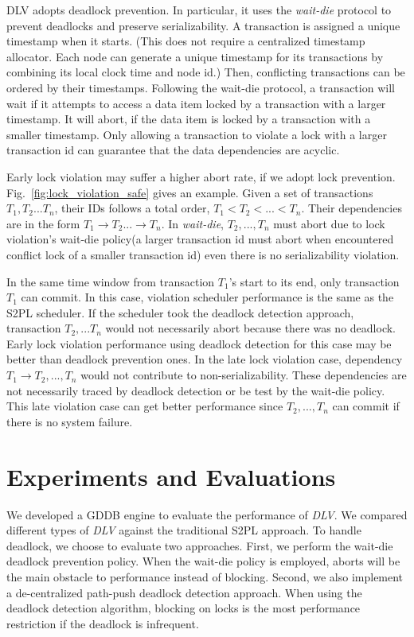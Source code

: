 \documentclass[conference]{IEEEtran}
\begin{document}
DLV adopts deadlock prevention.
In particular, it uses the \emph{wait-die} protocol to prevent deadlocks and preserve serializability.
A transaction is assigned a unique timestamp when it starts.
(This does not require a centralized timestamp allocator.
Each node can generate a unique timestamp for its transactions by combining its local clock time and node id.)
Then, conflicting transactions can be ordered by their timestamps.
Following the wait-die protocol, a transaction will wait if it attempts to access a data item locked by a transaction with a larger timestamp.
It will abort, if the data item is locked by a transaction with a smaller timestamp.
Only allowing a transaction to violate a lock with a larger transaction id can guarantee that the data dependencies are acyclic.


Early lock violation may suffer a higher abort rate, if we adopt lock prevention.
Fig.~\ref{fig:lock_violation_safe} gives an example.
Given a set of transactions ${T_1, T_2... T_n}$, their IDs follows a total order, ${T_1 < T_2 < ... < T_n}$.
Their dependencies are in the form ${T_1 \rightarrow T_2 ... \rightarrow T_n}$.
In \emph{wait-die}, ${T_2, ..., T_n}$ must abort due to lock violation's wait-die policy(a larger transaction id must abort when encountered conflict lock of a smaller transaction id) even there is no serializability violation.

In the same time window from transaction ${T_1}$'s start to its end, only transaction ${T_1}$ can commit.
In this case, violation scheduler performance is the same as the S2PL scheduler.
If the scheduler took the deadlock detection approach, transaction ${T_2, ... T_n}$ would not necessarily abort because there was no deadlock.
Early lock violation performance using deadlock detection for this case may be better than deadlock prevention ones.
In the late lock violation case, dependency ${T_1 \rightarrow T_2 , ... ,T_n}$ would not contribute to non-serializability.
These dependencies are not necessarily traced by deadlock detection or be test by the wait-die policy.
This late violation case can get better performance since ${T_2,..., T_n}$ can commit if there is no system failure.

\section{Experiments and Evaluations}
\label{sec:experiment}
We developed a GDDB engine to evaluate the performance of \emph{DLV}.
We compared different types of \emph{DLV} against the traditional S2PL approach.
To handle deadlock, we choose to evaluate two approaches.
First,  we perform the wait-die deadlock prevention policy.
When the wait-die policy is employed, aborts will be the main obstacle to performance instead of blocking.
Second, we also implement a de-centralized path-push deadlock detection approach.
When using the deadlock detection algorithm,  blocking on locks is the most performance restriction if the deadlock is infrequent.
\end{document}
